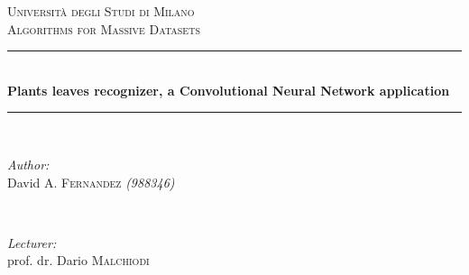 \documentclass[11pt]{article}
\begin{document}
\begin{titlepage}

\newcommand{\HRule}{\rule{\linewidth}{0.5mm}} %

\center %
 

\textsc{\LARGE Università degli Studi di Milano}\\[5.5cm] %
\textsc{\Large Algorithms for Massive Datasets}\\[0.5cm] %


\HRule \\[0.4cm]
{ \huge \bfseries Plants leaves recognizer, a Convolutional Neural Network application}\\[0.4cm] %
\HRule \\[1.5cm]
 

\begin{minipage}{0.4\textwidth}
\begin{flushleft} \large
\emph{Author:}\\
David A. \textsc{Fernandez} \textit{(988346)} \\
\end{flushleft}
\end{minipage}
~
\begin{minipage}{0.4\textwidth}
\begin{flushright} \large
\emph{Lecturer:} \\
prof. dr. Dario \textsc{Malchiodi} \\
\end{flushright}
\end{minipage}\\[2cm]


\end{titlepage}
\end{document}

